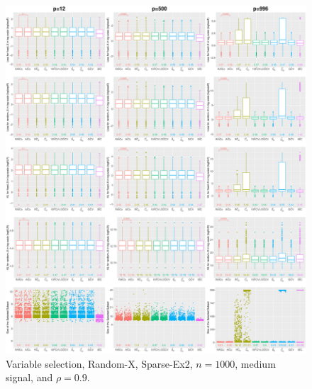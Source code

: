 \begin{figure}[!ht]
\centering
\includegraphics[width=\textwidth]{figures/supplement/randomx/subset_selection/Sparse-Ex2_n1000_msnr_rho09.eps}
\caption{Variable selection, Random-X, Sparse-Ex2, $n=1000$, medium signal, and $\rho=0.9$.}
\end{figure}
\clearpage
